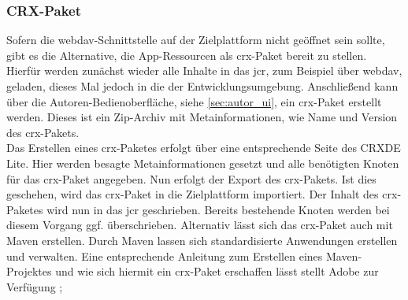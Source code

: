 \subsubsection{CRX-Paket}
Sofern die \ac{webdav}-Schnittstelle auf der Zielplattform nicht geöffnet sein sollte, gibt es die Alternative, die App-Ressourcen als \ac{crx}-Paket bereit zu stellen. Hierfür werden zunächst wieder alle Inhalte in das \ac{jcr}, zum Beispiel über \ac{webdav}, geladen, dieses Mal jedoch in die der Entwicklungsumgebung. Anschließend kann über die Autoren-Bedienoberfläche, siehe \autoref{sec:autor_ui}, ein \ac{crx}-Paket erstellt werden. Dieses ist ein Zip-Archiv mit Metainformationen, wie Name und Version des \ac{crx}-Pakets.\\
Das Erstellen eines \ac{crx}-Paketes erfolgt über eine entsprechende Seite des CRXDE Lite. Hier werden besagte Metainformationen gesetzt und alle benötigten Knoten für das \ac{crx}-Paket angegeben. Nun erfolgt der Export des \ac{crx}-Pakets. Ist dies geschehen, wird das \ac{crx}-Paket in die Zielplattform importiert. Der Inhalt des \ac{crx}-Paketes wird nun in das \ac{jcr} geschrieben. Bereits bestehende Knoten werden bei diesem Vorgang ggf. überschrieben.
Alternativ lässt sich das \ac{crx}-Paket auch mit Maven erstellen. Durch Maven lassen sich standardisierte Anwendungen erstellen und verwalten. Eine entsprechende Anleitung zum Erstellen eines Maven-Projektes und wie sich hiermit ein \ac{crx}-Paket erschaffen lässt stellt Adobe zur Verfügung \cite{Incorporated2017};